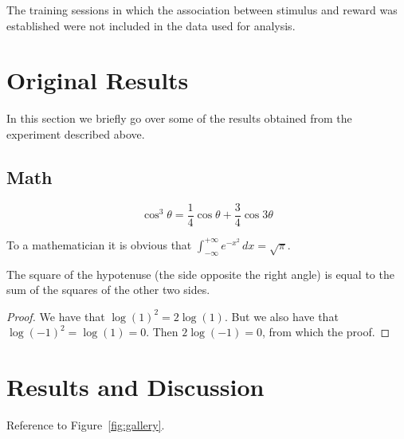 \documentclass[
10pt, %
a4paper, %
oneside, %
headinclude,footinclude, %
BCOR5mm, %
]{scrartcl}
\begin{document}
The training sessions in which the association between stimulus and reward was established were not included in the data used for analysis.

\section{Original Results}
In this section we briefly go over some of the results obtained from the experiment described above.                                                                                                                                                                                          

\subsection{Math}

\lipsum[4] %

\begin{equation}
\cos^3 \theta =\frac{1}{4}\cos\theta+\frac{3}{4}\cos 3\theta
\label{eq:refname2}
\end{equation}

\lipsum[5] %

\begin{definition}[Gauss] 
To a mathematician it is obvious that
$\int_{-\infty}^{+\infty}
e^{-x^2}\,dx=\sqrt{\pi}$. 
\end{definition} 

\begin{theorem}[Pythagoras]
The square of the hypotenuse (the side opposite the right angle) is equal to the sum of the squares of the other two sides.
\end{theorem}

\begin{proof} 
We have that $\log(1)^2 = 2\log(1)$.
But we also have that $\log(-1)^2=\log(1)=0$.
Then $2\log(-1)=0$, from which the proof.
\end{proof}


\section{Results and Discussion}

Reference to Figure~\vref{fig:gallery}. %
\end{document}
